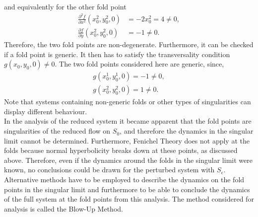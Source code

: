and equivalently for the other fold point
\begin{align*}
\frac{ \partial ^2 f}{ \partial x^2} (x_0^2,y_0^2,0) &= -2 x_0^2 =4\neq 0, \\
\frac{\partial f}{\partial y}(x_0^2,y_0^2, 0) &= -1 \neq 0.
\end{align*}
Therefore, the two fold points are non-degenerate. Furthermore, it can be checked if a fold point is generic. It then has to satisfy the transversality condition $g(x_0,y_0,0) \neq 0$.
The two fold points considered here are generic, since, 
\begin{align*}
g(x_0^1,y_0^1,0)= -1\neq 0, \\
g(x_0^2,y_0^2,0)= 1 \neq 0.
\end{align*}
Note that systems containing non-generic folds or other types of singularities can display different behaviour.\\

In the analysis of the reduced system it became apparent that the fold points are singularities of the reduced flow on $S_0$, and therefore the dynamics in the singular limit cannot be determined. Furthermore, Fenichel Theory does not apply at the folds because normal hyperbolicity breaks down at these points, as discussed above. Therefore, even if the dynamics around the folds in the singular limit were known, no conclusions could be drawn for the perturbed system with $S_\epsilon$.
Alternative methods have to be employed to describe the dynamics on the fold points in the singular limit and furthermore to be able to conclude the dynamics of the full system at the fold points from this analysis.
The method considered for analysis is called the Blow-Up Method.




